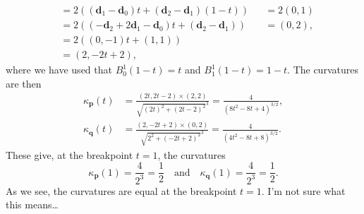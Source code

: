\begin{solution}
\begin{align*}
        &= 2 \left(\left( \mathbf{d}_1 - \mathbf{d}_0 \right) t + \left( \mathbf{d}_2 - \mathbf{d}_1 \right) (1 - t)\right) &
        &= 2 \left(0, 1\right) \\
        &= 2 \left(
            (-\mathbf{d}_2 + 2 \mathbf{d}_1 - \mathbf{d}_0)t + (\mathbf{d}_2 - \mathbf{d}_1)
        \right) &
        &= (0, 2), \\
        &= 2 \left(
            (0, -1)t + (1, 1)
        \right) \\
        &= (2, - 2t + 2),
    \end{align*}
    where we have used that $B_0^1(1 - t) = t$ and $B_1^1(1 - t) = 1 - t$.
    The curvatures are then
    \begin{align*}
        \kappa_{\mathbf{p}}(t) &= \frac{(2t, 2t - 2) \times (2, 2)}{\sqrt{(2t)^2 + (2t - 2)^2}^3} = \frac{4}{(8t^2 - 8t + 4)^{3/2}}, \\
        \kappa_{\mathbf{q}}(t) &= \frac{(2, -2t + 2) \times (0, 2)}{\sqrt{2^2 + (-2t + 2)^2}^3} = \frac{4}{(4t^2 - 8t + 8)^{3/2}}.
    \end{align*}
    These give, at the breakpoint $t = 1$, the curvatures
    \begin{equation*}
        \kappa_{\mathbf{p}}(1) = \frac{4}{2^3} = \frac{1}{2}
        \quad \text{and} \quad
        \kappa_{\mathbf{q}}(1) = \frac{4}{2^3} = \frac{1}{2}.
    \end{equation*}
    As we see, the curvatures are equal at the breakpoint $t = 1$.
    I'm not sure what this means\dots
\end{solution}